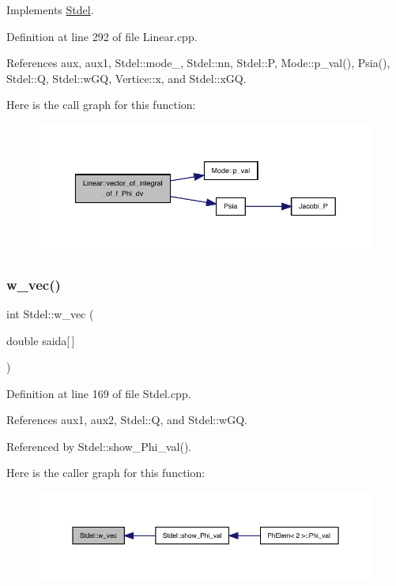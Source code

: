 Implements \hyperlink{classStdel_a3a22725f255ab04520ce1744eef8e2c0}{Stdel}.



Definition at line 292 of file Linear.\+cpp.



References aux, aux1, Stdel\+::mode\+\_\+, Stdel\+::nn, Stdel\+::P, Mode\+::p\+\_\+val(), Psia(), Stdel\+::Q, Stdel\+::w\+GQ, Vertice\+::x, and Stdel\+::x\+GQ.

Here is the call graph for this function\+:
\nopagebreak
\begin{figure}[H]
\begin{center}
\leavevmode
\includegraphics[width=350pt]{classLinear_a4ddfe0022d153dc9df417b84b6f7013d_cgraph}
\end{center}
\end{figure}
\mbox{\label{classStdel_a395c8d7d7890a9efdea23932fa22b420}} 
\subsubsection{\texorpdfstring{w\+\_\+vec()}{w\_vec()}}
{\footnotesize\ttfamily int Stdel\+::w\+\_\+vec (\begin{DoxyParamCaption}\item[{double}]{saida\mbox{[}$\,$\mbox{]} }\end{DoxyParamCaption})\hspace{0.3cm}{\ttfamily [inherited]}}



Definition at line 169 of file Stdel.\+cpp.



References aux1, aux2, Stdel\+::Q, and Stdel\+::w\+GQ.



Referenced by Stdel\+::show\+\_\+\+Phi\+\_\+val().

Here is the caller graph for this function\+:
\nopagebreak
\begin{figure}[H]
\begin{center}
\leavevmode
\includegraphics[width=350pt]{classStdel_a395c8d7d7890a9efdea23932fa22b420_icgraph}
\end{center}
\end{figure}


